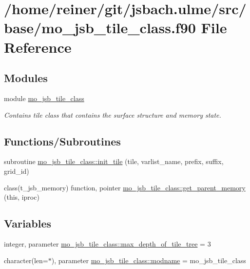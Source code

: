 \hypertarget{mo__jsb__tile__class_8f90}{}\section{/home/reiner/git/jsbach.ulme/src/base/mo\+\_\+jsb\+\_\+tile\+\_\+class.f90 File Reference}
\label{mo__jsb__tile__class_8f90}
\subsection*{Modules}
\begin{DoxyCompactItemize}
\item 
module \hyperlink{namespacemo__jsb__tile__class}{mo\+\_\+jsb\+\_\+tile\+\_\+class}
\begin{DoxyCompactList}\small\item\em Contains tile class that contains the surface structure and memory state. \end{DoxyCompactList}\end{DoxyCompactItemize}
\subsection*{Functions/\+Subroutines}
\begin{DoxyCompactItemize}
\item 
subroutine \hyperlink{namespacemo__jsb__tile__class_ae618ef8e5e010b55828d36a0b600d09d}{mo\+\_\+jsb\+\_\+tile\+\_\+class\+::init\+\_\+tile} (tile, varlist\+\_\+name, prefix, suffix, grid\+\_\+id)
\item 
class(t\+\_\+jsb\+\_\+memory) function, pointer \hyperlink{namespacemo__jsb__tile__class_a14e8d31e3dd0d8016d308d1e25f0639a}{mo\+\_\+jsb\+\_\+tile\+\_\+class\+::get\+\_\+parent\+\_\+memory} (this, iproc)
\end{DoxyCompactItemize}
\subsection*{Variables}
\begin{DoxyCompactItemize}
\item 
integer, parameter \hyperlink{namespacemo__jsb__tile__class_ae7cca4f90b1a19944271c16ec88438c2}{mo\+\_\+jsb\+\_\+tile\+\_\+class\+::max\+\_\+depth\+\_\+of\+\_\+tile\+\_\+tree} = 3
\item 
character(len=$\ast$), parameter \hyperlink{namespacemo__jsb__tile__class_add38f0b08fc10e2441ef68b92fa5a8c7}{mo\+\_\+jsb\+\_\+tile\+\_\+class\+::modname} = \textquotesingle{}mo\+\_\+jsb\+\_\+tile\+\_\+class\textquotesingle{}
\end{DoxyCompactItemize}
